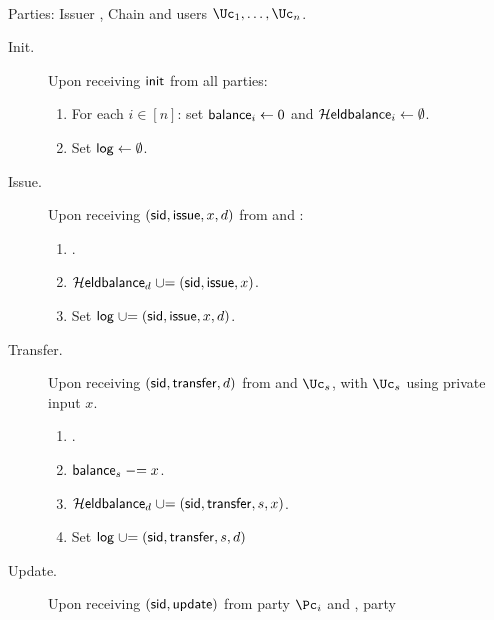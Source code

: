 \begin{functionality}\label{func:ConfidentialTransactions}~
	
	\item[Parties:]	Issuer \Ic, Chain \Cc and users  $\Uc_1, \ldots,\Uc_n$.
	
	\begin{description}
		\item[Init.] Upon receiving $\mathsf{init}$ from  all parties: 
		\begin{enumerate}
			\item  For each $i\in [n]$: set $\mathsf{balance}_i \leftarrow 0$ and $\mathcal{H}\mathsf{eldbalance}_i \leftarrow \emptyset$.
			
			\item Set $\mathsf{log} \leftarrow \emptyset$.
		\end{enumerate}
		
			\item[Issue.]   Upon receiving $(\mathsf{sid},\mathsf{issue},x,d)$ from  \Cc and \Ic:
		\begin{enumerate}
			
			
			\item {}.
			
			\item $\mathcal{H}\mathsf{eldbalance}_d \mathrel{\cup}= { (\mathsf{sid},\mathsf{issue},x)}$.
			
			\item Set $\mathsf{log} \mathrel{\cup}= {(\mathsf{sid},\mathsf{issue},x,d)}$.
		\end{enumerate}
		
		
		\item[Transfer.]    Upon receiving  $(\mathsf{sid},\mathsf{transfer},d)$ from  \Cc and  $\Uc_s$, with  $\Uc_s$ using private input $x$. 
		
	
		\begin{enumerate}
			\item {}.
			
			\item $\mathsf{balance}_s \mathrel{-}= x$.
			
			\item   $\mathcal{H}\mathsf{eldbalance}_d \mathrel{\cup}= (\mathsf{sid},\mathsf{transfer},s,x)$.
			
			\item Set $\mathsf{log} \mathrel{\cup}= {(\mathsf{sid},\mathsf{transfer},s,d)}$
			
		\end{enumerate}
		
		\item[Update.]     Upon receiving $(\mathsf{sid},\mathsf{update})$ from  party $\Pc_i$ and \Cc,  party \Cc
		

\end{description}
\end{functionality}
